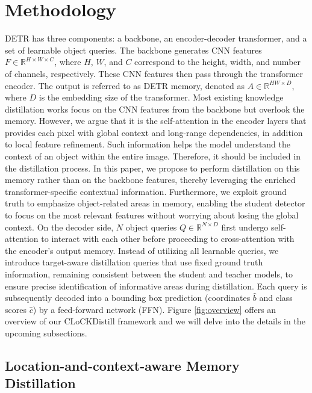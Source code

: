 \section{Methodology}

DETR has three components: a backbone, an encoder-decoder transformer, and a set of learnable object queries. The backbone generates CNN features $F \in \mathbb{R}^{H\times W\times C}$, where $H$, $W$, and $C$ correspond to the height, width, and number of channels, respectively. These CNN features then pass through the transformer encoder. The output is referred to as DETR memory, denoted as $A \in \mathbb{R}^{HW\times D}$, where $D$ is the embedding size of the transformer. Most existing knowledge distillation works focus on the CNN features from the backbone but overlook the memory. However, we argue that it is the self-attention in the encoder layers that provides each pixel with global context and long-range dependencies, in addition to local feature refinement. Such information helps the model understand the context of an object within the entire image. Therefore, it should be included in the distillation process.
In this paper, we propose to perform distillation on this memory rather than on the backbone features, thereby leveraging the enriched transformer-specific contextual information. Furthermore, we exploit ground truth to emphasize object-related areas in memory, enabling the student detector to focus on the most relevant features without worrying about losing the global context.
On the decoder side, $N$ object queries $Q \in \mathbb{R}^{N\times D}$ first undergo self-attention to interact with each other before proceeding to cross-attention with the encoder's output memory. Instead of utilizing all learnable queries, we introduce target-aware distillation queries that use fixed ground truth information, remaining consistent between the student and teacher models, to ensure precise identification of informative areas during distillation. Each query is subsequently decoded into a bounding box prediction (coordinates $\hat{b}$ and class scores $\hat{c}$) by a feed-forward network (FFN). 
Figure \ref{fig:overview} offers an overview of our CLoCKDistill framework and we will delve into the details in the upcoming subsections.


\subsection{Location-and-context-aware Memory Distillation}
\label{sec:location-and-context-aware Memory Distillation}

